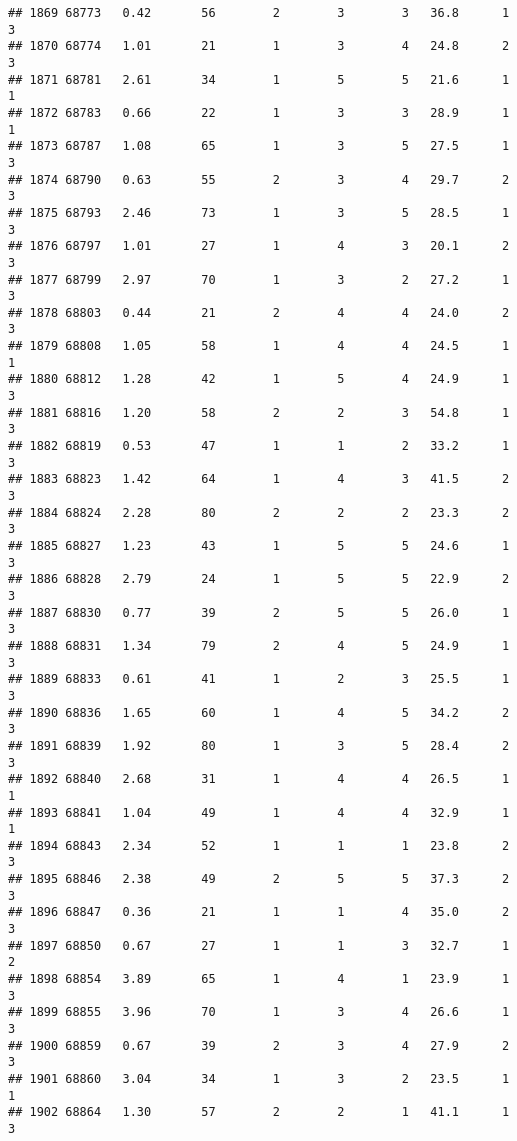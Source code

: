 \documentclass[
]{article}
\begin{document}
\begin{verbatim}
## 1869 68773   0.42       56        2        3        3   36.8      1      3
## 1870 68774   1.01       21        1        3        4   24.8      2      3
## 1871 68781   2.61       34        1        5        5   21.6      1      1
## 1872 68783   0.66       22        1        3        3   28.9      1      1
## 1873 68787   1.08       65        1        3        5   27.5      1      3
## 1874 68790   0.63       55        2        3        4   29.7      2      3
## 1875 68793   2.46       73        1        3        5   28.5      1      3
## 1876 68797   1.01       27        1        4        3   20.1      2      3
## 1877 68799   2.97       70        1        3        2   27.2      1      3
## 1878 68803   0.44       21        2        4        4   24.0      2      3
## 1879 68808   1.05       58        1        4        4   24.5      1      1
## 1880 68812   1.28       42        1        5        4   24.9      1      3
## 1881 68816   1.20       58        2        2        3   54.8      1      3
## 1882 68819   0.53       47        1        1        2   33.2      1      3
## 1883 68823   1.42       64        1        4        3   41.5      2      3
## 1884 68824   2.28       80        2        2        2   23.3      2      3
## 1885 68827   1.23       43        1        5        5   24.6      1      3
## 1886 68828   2.79       24        1        5        5   22.9      2      3
## 1887 68830   0.77       39        2        5        5   26.0      1      3
## 1888 68831   1.34       79        2        4        5   24.9      1      3
## 1889 68833   0.61       41        1        2        3   25.5      1      3
## 1890 68836   1.65       60        1        4        5   34.2      2      3
## 1891 68839   1.92       80        1        3        5   28.4      2      3
## 1892 68840   2.68       31        1        4        4   26.5      1      1
## 1893 68841   1.04       49        1        4        4   32.9      1      1
## 1894 68843   2.34       52        1        1        1   23.8      2      3
## 1895 68846   2.38       49        2        5        5   37.3      2      3
## 1896 68847   0.36       21        1        1        4   35.0      2      3
## 1897 68850   0.67       27        1        1        3   32.7      1      2
## 1898 68854   3.89       65        1        4        1   23.9      1      3
## 1899 68855   3.96       70        1        3        4   26.6      1      3
## 1900 68859   0.67       39        2        3        4   27.9      2      3
## 1901 68860   3.04       34        1        3        2   23.5      1      1
## 1902 68864   1.30       57        2        2        1   41.1      1      3

\end{verbatim}
\end{document}
